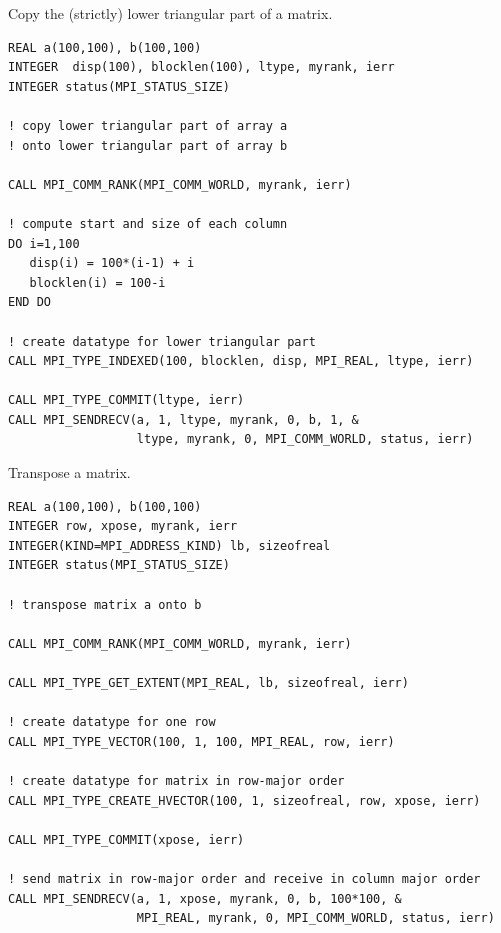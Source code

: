 \begin{example}
\label{pt2pt-exDD}
%
Copy the (strictly) lower triangular part of a matrix.
\begin{lstlisting}[language={[MPI]Fortran}]
REAL a(100,100), b(100,100)
INTEGER  disp(100), blocklen(100), ltype, myrank, ierr
INTEGER status(MPI_STATUS_SIZE)

! copy lower triangular part of array a
! onto lower triangular part of array b

CALL MPI_COMM_RANK(MPI_COMM_WORLD, myrank, ierr)

! compute start and size of each column
DO i=1,100
   disp(i) = 100*(i-1) + i
   blocklen(i) = 100-i
END DO

! create datatype for lower triangular part
CALL MPI_TYPE_INDEXED(100, blocklen, disp, MPI_REAL, ltype, ierr)

CALL MPI_TYPE_COMMIT(ltype, ierr)
CALL MPI_SENDRECV(a, 1, ltype, myrank, 0, b, 1, &
                  ltype, myrank, 0, MPI_COMM_WORLD, status, ierr)
\end{lstlisting}
\end{example}

\begin{example}
\label{pt2pt-exEE}
%
%
Transpose a matrix.

\begin{lstlisting}[language={[MPI]Fortran}]
REAL a(100,100), b(100,100)
INTEGER row, xpose, myrank, ierr
INTEGER(KIND=MPI_ADDRESS_KIND) lb, sizeofreal
INTEGER status(MPI_STATUS_SIZE)

! transpose matrix a onto b

CALL MPI_COMM_RANK(MPI_COMM_WORLD, myrank, ierr)

CALL MPI_TYPE_GET_EXTENT(MPI_REAL, lb, sizeofreal, ierr)

! create datatype for one row
CALL MPI_TYPE_VECTOR(100, 1, 100, MPI_REAL, row, ierr)

! create datatype for matrix in row-major order
CALL MPI_TYPE_CREATE_HVECTOR(100, 1, sizeofreal, row, xpose, ierr)

CALL MPI_TYPE_COMMIT(xpose, ierr)

! send matrix in row-major order and receive in column major order
CALL MPI_SENDRECV(a, 1, xpose, myrank, 0, b, 100*100, &
                  MPI_REAL, myrank, 0, MPI_COMM_WORLD, status, ierr)
\end{lstlisting}
\end{example}

